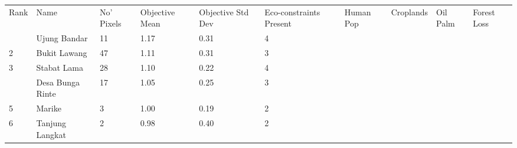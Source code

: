 \begin{table}[ht]
\centering
\begingroup\fontsize{9pt}{10pt}\selectfont
\begin{tabular}{C{0.05\textwidth}C{0.15\textwidth}C{0.08\textwidth}C{0.08\textwidth}C{0.08\textwidth}C{0.08\textwidth}C{0.08\textwidth}C{0.08\textwidth}C{0.08\textwidth}C{0.08\textwidth}}
 Rank & Name & No' Pixels & Objective Mean & Objective Std Dev & Eco-constraints  Present & Human Pop & Croplands & Oil Palm & Forest Loss \\ 
  & Ujung Bandar &  11 & \textcolor[HTML]{FFFFFF}{1.17} & \textcolor[HTML]{000000}{0.31} & \textcolor[HTML]{FFFFFF}{4} &  &  &  &  \\ 
  {2} & Bukit Lawang &  47 & \textcolor[HTML]{FFFFFF}{1.11} & \textcolor[HTML]{000000}{0.31} & \textcolor[HTML]{000000}{3} &  &  &  &  \\ 
  {3} & Stabat Lama &  28 & \textcolor[HTML]{FFFFFF}{1.10} & \textcolor[HTML]{000000}{0.22} & \textcolor[HTML]{FFFFFF}{4} &  &  &  &  \\ 
   & Desa Bunga Rinte &  17 & \textcolor[HTML]{FFFFFF}{1.05} & \textcolor[HTML]{000000}{0.25} & \textcolor[HTML]{000000}{3} &  &  &  &  \\ 
  {5} & Marike &   3 & \textcolor[HTML]{FFFFFF}{1.00} & \textcolor[HTML]{000000}{0.19} & \textcolor[HTML]{000000}{2} &  &  &  &  \\ 
  {6} & Tanjung Langkat &   2 & \textcolor[HTML]{FFFFFF}{0.98} & \textcolor[HTML]{FFFFFF}{0.40} & \textcolor[HTML]{000000}{2} &  &  &  &  \\ 

\end{tabular}
\end{table}

